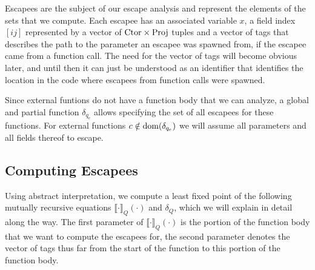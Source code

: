 Escapees are the subject of our escape analysis and represent the elements of the sets that we compute. Each escapee has an associated variable $x$, a field index $[ij]$ represented by a vector of $\mathrm{Ctor} \times \mathrm{Proj}$ tuples and a vector of tags that describes the path to the parameter an escapee was spawned from, if the escapee came from a function call. The need for the vector of tags will become obvious later, and until then it can just be understood as an identifier that identifies the location in the code where escapees from function calls were spawned. 

Since external funtions do not have a function body that we can analyze, a global and partial function $\delta_{q_e}$ allows specifying the set of all escapees for these functions. For external functions $c \notin \mathrm{dom}(\delta_{q_e})$ we will assume all parameters and all fields thereof to escape.

\subsection{Computing Escapees}

\newcommand{\ecp}[2]{\llbracket {#1} \rrbracket_Q \left( {#2} \right)}

Using abstract interpretation, we compute a least fixed point of the following mutually recursive equations $\ecp{\cdot}{\cdot}$ and $\delta_Q$, which we will explain in detail along the way. The first parameter of $\ecp{\cdot}{\cdot}$ is the portion of the function body that we want to compute the escapees for, the second parameter denotes the vector of tags thus far from the start of the function to this portion of the function body.

